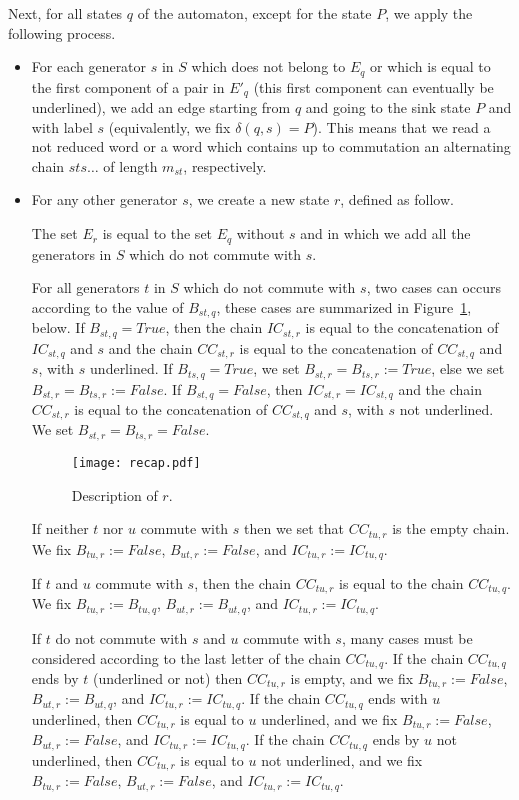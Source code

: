 \documentclass[reqno,12pt]{amsart}
\theoremstyle{definition}
\begin{document}
 Next, for all states $q$ of the automaton, except for the state $P$, we apply the following process.
\begin{itemize}
\item For each generator $s$ in $S$ which does not belong to $E_q$ or which is equal to the first component of a pair in $E'_q$ (this first component can eventually be underlined), we add an edge starting from $q$ and going to the sink state $P$ and with label $s$ (equivalently, we fix $\delta(q,s)=P$). This means that we read a not reduced word or a word which contains up to commutation an alternating chain  $sts\ldots$ of length $m_{st}$, respectively.

\item For any other generator $s$, we create a new state $r$, defined as follow.  

The set $E_r$ is equal to the set $E_q$ without $s$ and in which we add all the generators in $S$ which do not commute with $s$.

For all  generators $t$ in $S$  which do not commute with  $s$, two cases can occurs according to the value of $B_{st,q}$, these cases are summarized in Figure~\ref{figrecap}, below.   If $B_{st, q} = True$, then the chain  $IC_{st,r}$ is equal to the concatenation of  $IC_{st,q}$ and $s$ and the chain  $CC_{st,r}$ is equal to the concatenation of  $CC_{st,q}$ and $s$, with $s$ underlined. If $B_{ts,q}= True$, we set $B_{st,r}= B_{ts,r}:= True$, else we set $B_{st,r}=B_{ts,r}:=False$. If $B_{st, q} = False$, then $IC_{st,r}=IC_{st,q}$ and the chain $CC_{st,r}$ is equal to the concatenation of $CC_{st,q}$ and $s$, with $s$ not underlined. We set $B_{st,r}=B_{ts,r}= False$.

\begin{figure}[!h]
\texttt{[image: recap.pdf]}
\caption{\label{figrecap}Description of $r$. }
\end{figure}
 
  If neither  $t$ nor $u$ commute with $s$ then we set that $CC_{tu,r}$ is the empty chain. We fix  $B_{tu,r}:= False$, $B_{ut,r}:= False$, and $IC_{tu,r}:=IC_{tu,q}$. 
 
 
  If $t$ and $u$ commute with $s$, then the chain $CC_{tu,r}$ is equal to the chain $CC_{tu,q}$. We fix $B_{tu,r}:=B_{tu,q}$, $B_{ut,r}:=B_{ut,q}$, and $IC_{tu,r}:=IC_{tu,q}$.  
 
 If $t$ do not commute with $s$ and  $u$ commute with $s$, many cases must be considered according to the last letter  of the chain  $CC_{tu,q}$. If the chain  $CC_{tu,q}$ ends by $t$ (underlined or not) then $ CC_{tu,r}$ is empty, and we fix $B_{tu,r} := False $, $B_{ut,r}:=B_{ut,q}$, and $IC_{tu,r}:= IC_{tu,q}$. If the chain $CC_{tu,q}$ ends with $u$ underlined, then $ CC_{tu,r}$ is equal to $u$ underlined, and we fix $B_{tu,r} := False $, $B_{ut,r}:=False$, and $IC_{tu,r}:= IC_{tu,q}$. If the chain $CC_{tu,q}$ ends by $u$ not underlined, then $ CC_{tu,r}$ is equal to  $u$ not underlined, and we fix $B_{tu,r} := False $, $B_{ut,r}:=False$, and $IC_{tu,r}:= IC_{tu,q}$.
 

\end{itemize}
\end{document}
